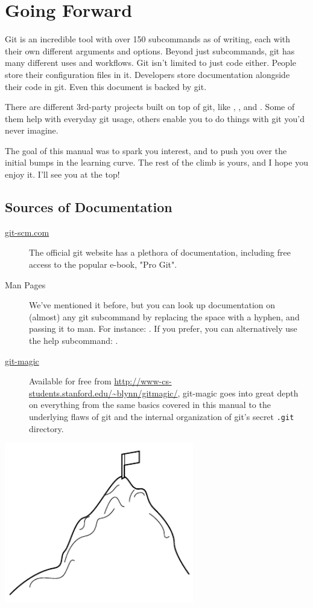 \documentclass[11pt,letterpaper,twoside]{report}
\begin{document}
\chapter{Going Forward}

Git is an incredible tool with over 150 subcommands as of writing, each with
their own different arguments and options. Beyond just subcommands, git has many
different uses and workflows. Git isn't limited to just code either. People
store their configuration files in it. Developers store documentation alongside
their code in git. Even this document is backed by git.

There are different 3rd-party projects built on top of git, like
, , and . Some of them help
with everyday git usage, others enable you to do things with git you'd never
imagine.

The goal of this manual was to spark you interest, and to push you over the
initial bumps in the learning curve. The rest of the climb is yours, and I hope
you enjoy it. I'll see you at the top!

\section{Sources of Documentation}

\begin{description}
\item[\href{http://git-scm.com/documentation}{git-scm.com}]
    The official git website has a plethora of documentation, including free
    access to the popular e-book, "Pro Git".
\item[Man Pages]
    We've mentioned it before, but you can look up documentation on (almost) any
    git subcommand by replacing the space with a hyphen, and passing it to man.
    For instance: . If you prefer, you can alternatively use
    the help subcommand: .
\item[\href{http://www-cs-students.stanford.edu/~blynn/gitmagic/}{git-magic}]
    Available for free from
    \url{http://www-cs-students.stanford.edu/~blynn/gitmagic/}, git-magic goes
    into great depth on everything from the same basics covered in this manual
    to the underlying flaws of git and the internal organization of git's secret
    \texttt{.git} directory.
\end{description}

\vspace{\fill}
\begin{flushright}
\includegraphics[height=7cm]{resources/learning_curve_abstract.pdf}
\end{flushright}
\vspace*{\fill}
\end{document}

